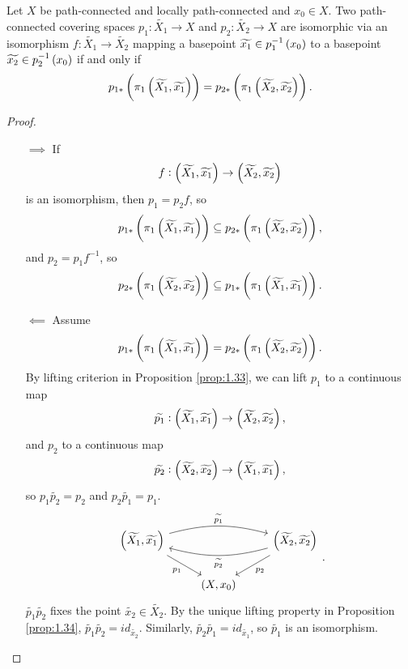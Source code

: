 \begin{proposition}
\label{prop:1.37}
Let $ X $ be path-connected and locally path-connected and $ x_0 \in X $. Two path-connected covering spaces $ p_1 : \widetilde{X_1} \to X $ and $ p_2 : \widetilde{X_2} \to X $ are isomorphic via an isomorphism $ f : \widetilde{X_1} \to \widetilde{X_2} $ mapping a basepoint $ \widetilde{x_1} \in p_1^{-1}\br{x_0} $ to a basepoint $ \widetilde{x_2} \in p_2^{-1}\br{x_0} $ if and only if
$$ p_{1*}\br{\pi_1\br{\widetilde{X_1}, \widetilde{x_1}}} = p_{2*}\br{\pi_1\br{\widetilde{X_2}, \widetilde{x_2}}}. $$
\end{proposition}

\begin{proof}
\hfill
\begin{itemize}
\item[$ \implies $] If
$$ f : \br{\widetilde{X_1}, \widetilde{x_1}} \to \br{\widetilde{X_2}, \widetilde{x_2}} $$
is an isomorphism, then $ p_1 = p_2f $, so
$$ p_{1*}\br{\pi_1\br{\widetilde{X_1}, \widetilde{x_1}}} \subseteq p_{2*}\br{\pi_1\br{\widetilde{X_2}, \widetilde{x_2}}}, $$
and $ p_2 = p_1f^{-1} $, so
$$ p_{2*}\br{\pi_1\br{\widetilde{X_2}, \widetilde{x_2}}} \subseteq p_{1*}\br{\pi_1\br{\widetilde{X_1}, \widetilde{x_1}}}. $$
\item[$ \impliedby $] Assume
$$ p_{1*}\br{\pi_1\br{\widetilde{X_1}, \widetilde{x_1}}} = p_{2*}\br{\pi_1\br{\widetilde{X_2}, \widetilde{x_2}}}. $$
By lifting criterion in Proposition \ref{prop:1.33}, we can lift $ p_1 $ to a continuous map
$$ \widetilde{p_1} : \br{\widetilde{X_1}, \widetilde{x_1}} \to \br{\widetilde{X_2}, \widetilde{x_2}}, $$
and $ p_2 $ to a continuous map
$$ \widetilde{p_2} : \br{\widetilde{X_2}, \widetilde{x_2}} \to \br{\widetilde{X_1}, \widetilde{x_1}}, $$
so $ p_1\widetilde{p_2} = p_2 $ and $ p_2\widetilde{p_1} = p_1 $.
$$
\begin{tikzcd}
\br{\widetilde{X_1}, \widetilde{x_1}} \arrow[bend left=15]{rr}{\widetilde{p_1}} \arrow[swap]{dr}{p_1} & & \br{\widetilde{X_2}, \widetilde{x_2}} \arrow{dl}{p_2} \arrow[bend left=15]{ll}{\widetilde{p_2}} \\
& \br{X, x_0} &
\end{tikzcd}.
$$
$ \widetilde{p_1}\widetilde{p_2} $ fixes the point $ \widetilde{x_2} \in \widetilde{X_2} $. By the unique lifting property in Proposition \ref{prop:1.34}, $ \widetilde{p_1}\widetilde{p_2} = id_{\widetilde{x_2}} $. Similarly, $ \widetilde{p_2}\widetilde{p_1} = id_{\widetilde{x_1}} $, so $ \widetilde{p_1} $ is an isomorphism.
\end{itemize}
\end{proof}

